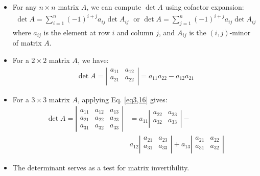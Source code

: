\begin{frame}{}
\begin{itemize}
    \item For any $n \times n$ matrix $A$, we can compute $\det A$ using cofactor expansion:
    \begin{align}
        \det A = \sum_{i=1}^{n} (-1)^{i+j}a_{ij} \det A_{ij} \; \text{ or }   \det A = \sum_{j=1}^{n} (-1)^{i+j}a_{ij} \det A_{ij} \label{eq3,16}
    \end{align}
    where $a_{ij}$ is the element at row $i$ and column $j$, and $A_{ij}$ is the $(i,j)$-minor of matrix $A$.
    \item For a $2 \times 2$ matrix $A$, we have:
    \begin{align}
        \det A  = \left\vert\begin{matrix}
            a_{11} & a_{12} \\
            a_{21} & a_{22}  \\
        \end{matrix}\right\vert = a_{11}a_{22} - a_{12}a_{21}
    \end{align}
\end{itemize}
\end{frame}
\begin{frame}{}
\begin{itemize}
    \item For a $3 \times 3$ matrix $A$, applying Eq. \ref{eq3,16} gives:
    \begin{align*}
        \det A = \left\vert\begin{matrix}
            a_{11} & a_{12} &  a_{13}\\
            a_{21} & a_{22} & a_{23} \\
            a_{31} & a_{32} &a_{33}
        \end{matrix}\right\vert  &= a_{11} \left\vert\begin{matrix}
            a_{22} & a_{23} \\
            a_{32} & a_{33}  \\
        \end{matrix}\right\vert  -\\
        & a_{12}\left\vert\begin{matrix}
            a_{21} & a_{23} \\
            a_{31} & a_{33}  \\
        \end{matrix}\right\vert + a_{13} \left\vert\begin{matrix}
            a_{21} & a_{22} \\
            a_{31} & a_{32}  \\
        \end{matrix}\right\vert
    \end{align*}
    \item The determinant serves as a test for matrix invertibility.
\end{itemize}
\end{frame}
